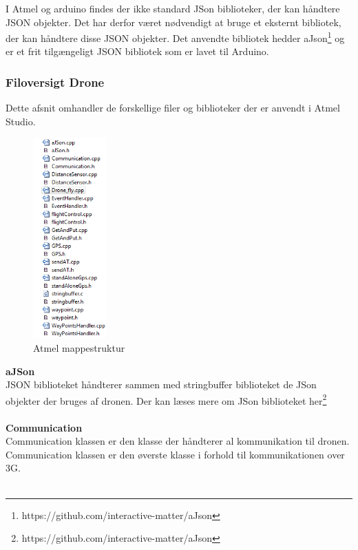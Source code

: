 I Atmel og arduino findes der ikke standard JSon biblioteker, der kan håndtere JSON objekter. Det har derfor været nødvendigt at bruge et eksternt bibliotek, der kan håndtere disse JSON objekter.
Det anvendte bibliotek hedder aJson\footnote{https://github.com/interactive-matter/aJson} og er et frit tilgængeligt JSON bibliotek som er lavet til Arduino.


\subsubsection*{Filoversigt Drone}

Dette afsnit omhandler de forskellige filer og biblioteker der er anvendt i Atmel Studio. 


\begin{figure}[H]
	\centering
	\includegraphics[width=0.25\textwidth]{Billeder/implementation/Howtoguide/atmel_filer.png}
	\caption{Atmel mappestruktur}
	\label{fig:drone_mappestruktur}
\end{figure}

\textbf{aJSon}\\
JSON biblioteket håndterer sammen med stringbuffer biblioteket de JSon objekter der bruges af dronen. Der kan læses mere om JSon biblioteket her\footnote{https://github.com/interactive-matter/aJson} \\ \\

\textbf{Communication}\\
Communication klassen er den klasse der håndterer al kommunikation til dronen. Communication klassen er den øverste klasse i forhold til kommunikationen over 3G. \\ \\

